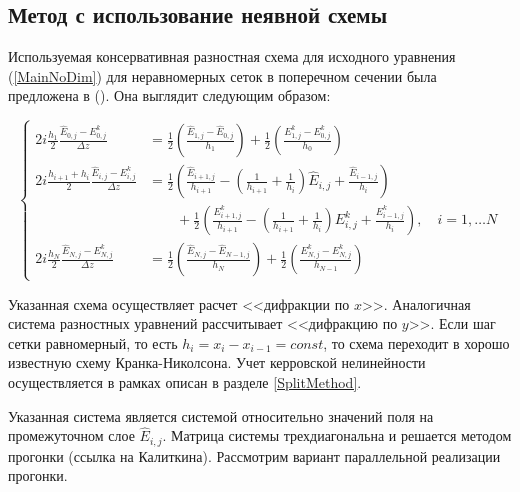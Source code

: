 \subsection{Метод с использование неявной схемы}
Используемая консервативная разностная схема для исходного уравнения (\ref{MainNoDim}) для неравномерных сеток в поперечном сечении была предложена в (\cite{SweepScheme}). Она выглядит следующим образом:

\begin{equation}\label{sweep_diff_sys}
    \left\{
    \begin{aligned}
        2i\frac{h_1}{2}\frac{\hat{E}_{0,j}-E^k_{0,j}}{\Delta z} &= \frac{1}{2}\left(\frac{\hat{E}_{1,j}-\hat{E}_{0,j}}{h_1}\right) + \frac{1}{2}\left(\frac{E^k_{1,j}-E^k_{0,j}}{h_0}\right)\\
        2i\frac{h_{i+1}+h_i}{2}\frac{\hat{E}_{i,j}-E^k_{i,j}}{\Delta z} &= \frac{1}{2}\left(\frac{\hat{E}_{i+1,j}}{h_{i+1}} -\left(\frac{1}{h_{i+1}} + \frac{1}{h_i}\right)\hat{E}_{i,j} + \frac{\hat{E}_{i-1,j}}{h_i}\right) \\
        &\qquad+ \frac{1}{2}\left(\frac{E^k_{i+1,j}}{h_{i+1}} -\left(\frac{1}{h_{i+1}} + \frac{1}{h_i}\right)E^k_{i,j} + \frac{E^k_{i-1,j}}{h_i}\right),\quad i=1,\ldots N\\
        2i\frac{h_N}{2}\frac{\hat{E}_{N,j}-E^k_{N,j}}{\Delta z} &= \frac{1}{2}\left(\frac{\hat{E}_{N,j}-\hat{E}_{N-1,j}}{h_N}\right) + \frac{1}{2}\left(\frac{E^k_{N,j}-E^k_{N,j}}{h_{N-1}}\right)
    \end{aligned}
    \right.
\end{equation}

Указанная схема осуществляет расчет <<дифракции по $x$>>.
Аналогичная система разностных уравнений рассчитывает <<дифракцию по $y$>>.
Если шаг сетки равномерный, то есть $h_i=x_i-x_{i-1}=const$, то схема переходит в хорошо известную схему Кранка-Николсона.
Учет керровской нелинейности осуществляется в рамках описан в разделе \ref{SplitMethod}.

Указанная система является системой относительно значений поля на промежуточном слое $\hat{E}_{i,j}$.
Матрица системы трехдиагональна и решается методом прогонки (ссылка на Калиткина).
Рассмотрим вариант параллельной реализации прогонки.

